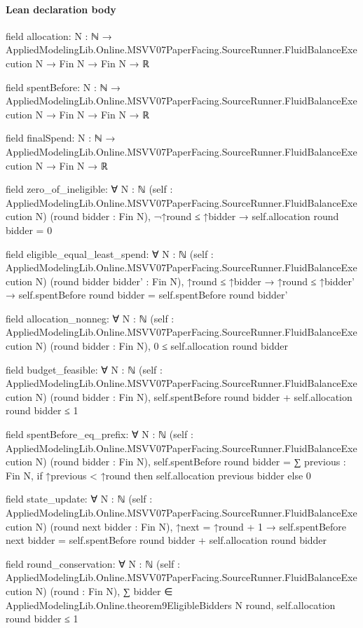 \documentclass[10pt]{article}
\begin{document}
\paragraph{Lean declaration body}
\begin{ReviewVerbatim}
field allocation:
{N : ℕ} → AppliedModelingLib.Online.MSVV07PaperFacing.SourceRunner.FluidBalanceExecution N → Fin N → Fin N → ℝ

field spentBefore:
{N : ℕ} → AppliedModelingLib.Online.MSVV07PaperFacing.SourceRunner.FluidBalanceExecution N → Fin N → Fin N → ℝ

field finalSpend:
{N : ℕ} → AppliedModelingLib.Online.MSVV07PaperFacing.SourceRunner.FluidBalanceExecution N → Fin N → ℝ

field zero_of_ineligible:
∀ {N : ℕ} (self : AppliedModelingLib.Online.MSVV07PaperFacing.SourceRunner.FluidBalanceExecution N)
  (round bidder : Fin N), ¬↑round ≤ ↑bidder → self.allocation round bidder = 0

field eligible_equal_least_spend:
∀ {N : ℕ} (self : AppliedModelingLib.Online.MSVV07PaperFacing.SourceRunner.FluidBalanceExecution N)
  (round bidder bidder' : Fin N),
  ↑round ≤ ↑bidder → ↑round ≤ ↑bidder' → self.spentBefore round bidder = self.spentBefore round bidder'

field allocation_nonneg:
∀ {N : ℕ} (self : AppliedModelingLib.Online.MSVV07PaperFacing.SourceRunner.FluidBalanceExecution N)
  (round bidder : Fin N), 0 ≤ self.allocation round bidder

field budget_feasible:
∀ {N : ℕ} (self : AppliedModelingLib.Online.MSVV07PaperFacing.SourceRunner.FluidBalanceExecution N)
  (round bidder : Fin N), self.spentBefore round bidder + self.allocation round bidder ≤ 1

field spentBefore_eq_prefix:
∀ {N : ℕ} (self : AppliedModelingLib.Online.MSVV07PaperFacing.SourceRunner.FluidBalanceExecution N)
  (round bidder : Fin N),
  self.spentBefore round bidder = ∑ previous : Fin N, if ↑previous < ↑round then self.allocation previous bidder else 0

field state_update:
∀ {N : ℕ} (self : AppliedModelingLib.Online.MSVV07PaperFacing.SourceRunner.FluidBalanceExecution N)
  (round next bidder : Fin N),
  ↑next = ↑round + 1 → self.spentBefore next bidder = self.spentBefore round bidder + self.allocation round bidder

field round_conservation:
∀ {N : ℕ} (self : AppliedModelingLib.Online.MSVV07PaperFacing.SourceRunner.FluidBalanceExecution N) (round : Fin N),
  ∑ bidder ∈ AppliedModelingLib.Online.theorem9EligibleBidders N round, self.allocation round bidder ≤ 1


\end{ReviewVerbatim}
\end{document}
